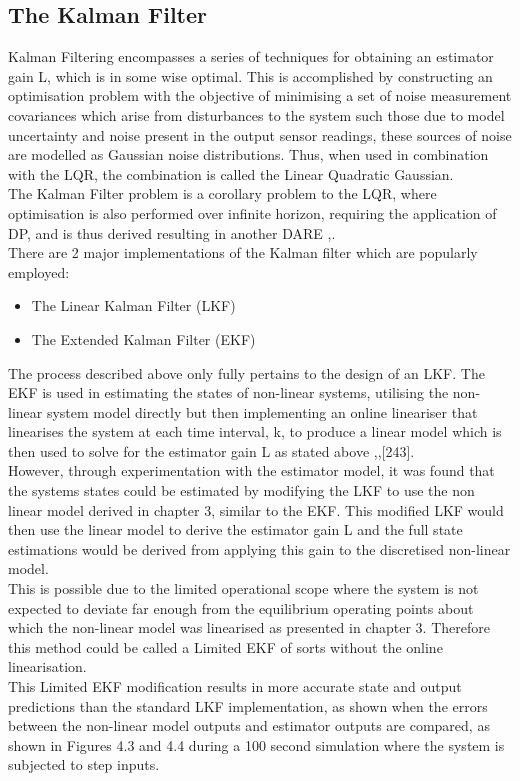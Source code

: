 \documentclass[12pt,a4paper,twoside]{report}
\begin{document}
			\subsection*{The Kalman Filter}
				
				Kalman Filtering encompasses a series of techniques for obtaining an estimator gain L, which is in some wise optimal. This is accomplished by constructing an optimisation problem with the objective of minimising a set of noise measurement covariances which arise from disturbances to the system such those due to model uncertainty and noise present in the output sensor readings, these sources of noise are modelled as Gaussian noise distributions. Thus, when used in combination with the LQR, the combination is called the Linear Quadratic Gaussian.  
				\\
				The Kalman Filter problem is a corollary problem to the LQR, where optimisation is also performed over infinite horizon, requiring the application of DP, and is thus derived resulting in another DARE \cite{18},\cite{21}.
				\\
				There are 2 major implementations of the Kalman filter which are popularly employed:
					
				\begin{itemize}
					\item 
						The Linear Kalman Filter (LKF)
					\item 
						The Extended Kalman Filter (EKF)
				\end{itemize} 
				\space
				The process described above only fully pertains to the design of an LKF. The EKF is used in estimating the states of non-linear systems, utilising the non-linear system model directly but then implementing an online lineariser that linearises the system at each time interval, k, to produce a linear model which is then used to solve for the estimator gain L as stated above \cite{21},\cite{22},[243].
				\\
				However, through experimentation with the estimator model, it was found that the systems states could be estimated by modifying the LKF to use the non linear model derived in chapter 3, similar to the EKF. This modified LKF would then use the linear model to derive the estimator gain L and the full state estimations would be derived from applying this gain to the discretised non-linear model.
				\\
				This is possible due to the limited operational scope where the system is not expected to deviate far enough from the equilibrium operating points about which the non-linear model was linearised as presented in chapter 3. Therefore this method could be called a Limited EKF of sorts without the online linearisation.
				\\
				This Limited EKF modification results in more accurate state and output predictions than the standard LKF implementation, as shown when the errors between the non-linear model outputs and estimator outputs are compared, as shown in Figures 4.3 and 4.4 during a 100 second simulation where the system is subjected to step inputs. 
					
\end{document}
